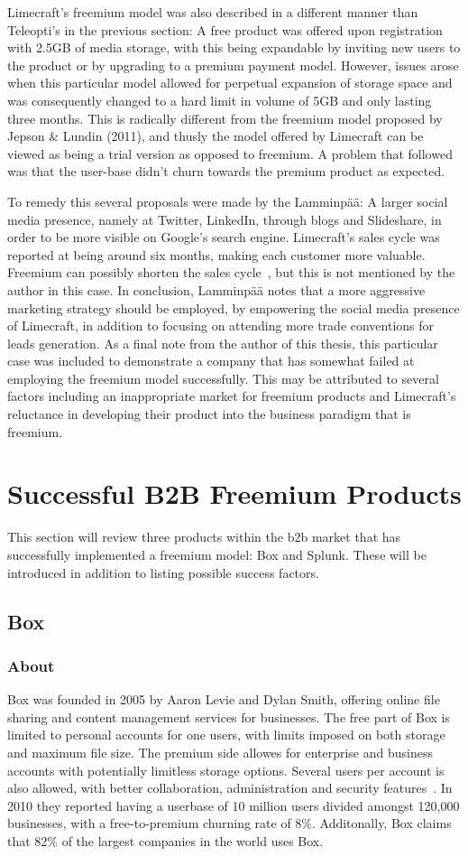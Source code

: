 Limecraft's freemium model was also described in a different manner than Teleopti's in the previous section: A free product was offered upon registration with 2.5GB of media storage, with this being expandable by inviting new users to the product or by upgrading to a premium payment model. However, issues arose when this particular model allowed for perpetual expansion of storage space and was consequently changed to a hard limit in volume of 5GB and only lasting three months. This is radically different from the freemium model proposed by Jepson \& Lundin (2011), and thusly the model offered by Limecraft can be viewed as being a trial version as opposed to freemium. A problem that followed was that the user-base didn't churn towards the premium product as expected. 


To remedy this several proposals were made by the Lamminpää: A larger social media presence, namely at Twitter, LinkedIn, through blogs and Slideshare, in order to be more visible on Google's search engine. Limecraft's sales cycle was reported at being around six months, making each customer more valuable. Freemium can possibly shorten the sales cycle~\cite{davidskokN/A}, but this is not mentioned by the author in this case. In conclusion, Lamminpää notes that a more aggressive marketing strategy should be employed, by empowering the social media presence of Limecraft, in addition to focusing on attending more trade conventions for leads generation. As a final note from the author of this thesis, this particular case was included to demonstrate a company that has somewhat failed at employing the freemium model successfully. This may be attributed to several factors including an inappropriate market for freemium products and Limecraft's reluctance in developing their product into the business paradigm that is freemium. 
\section{Successful B2B Freemium Products}
This section will review three products within the \gls{b2b} market that has successfully implemented a freemium model: Box and Splunk. These will be introduced in addition to listing possible success factors.
\subsection{Box}
\subsubsection{About}
Box was founded in 2005 by Aaron Levie and Dylan Smith, offering online file sharing and content management services for businesses. The free part of Box is limited to personal accounts for one users, with limits imposed on both storage and maximum file size. The premium side allowes for enterprise and business accounts with potentially limitless storage options. Several users per account is also allowed, with better collaboration, administration and security features~\cite{freemium.orgN/A}. In 2010 they reported having a userbase of 10 million users divided amongst 120,000 businesses, with a free-to-premium churning rate of 8\%. Additonally, Box claims that 82\% of the largest companies in the world uses Box.
